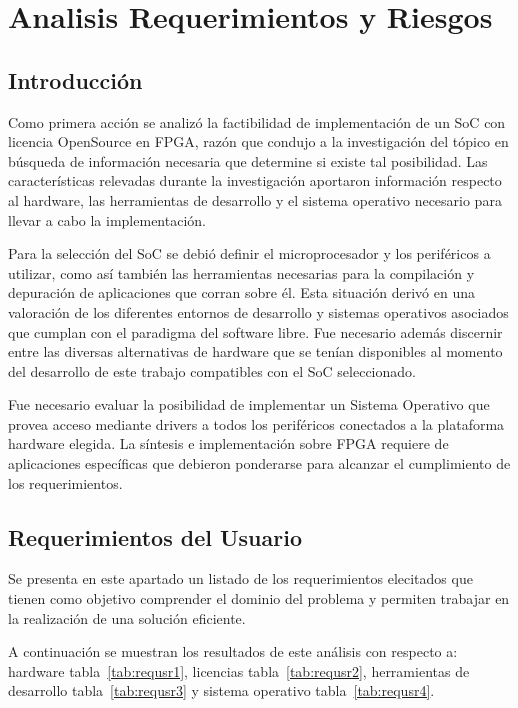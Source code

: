 \chapter{Analisis Requerimientos y Riesgos}\label {chap:reqyries}
	
	\section{Introducción}
	\par
	Como primera acción se analizó la factibilidad de implementación de un SoC con licencia OpenSource en FPGA, razón que condujo a la investigación del
	tópico en búsqueda de información necesaria que determine si existe tal posibilidad. Las características relevadas durante la investigación
	aportaron información respecto al hardware, las herramientas de desarrollo y el sistema operativo necesario para llevar a cabo la implementación. 
	\par
	Para la selección del SoC se debió definir el microprocesador y los periféricos a utilizar, como así también las herramientas necesarias para la
	compilación y depuración de aplicaciones que corran sobre él. Esta situación derivó en una valoración de los diferentes entornos de desarrollo y
	sistemas operativos asociados que cumplan con el paradigma del software libre. Fue necesario además discernir entre las diversas alternativas de
	hardware que se tenían disponibles al momento del desarrollo de este trabajo compatibles con el SoC seleccionado. 
	\par
	Fue necesario evaluar la posibilidad de implementar un Sistema Operativo que provea acceso mediante drivers a todos los periféricos conectados a
	la plataforma hardware elegida. La síntesis e implementación sobre FPGA requiere de aplicaciones específicas que debieron ponderarse para alcanzar el
	cumplimiento de los requerimientos.
	
	\newpage 
	
	\section{Requerimientos del Usuario}\label{sec:requsuario}
	\par
	Se presenta en este apartado un listado de los requerimientos elecitados que tienen como objetivo comprender el dominio del problema y permiten trabajar en la realización de una solución eficiente.

	A continuación se muestran los resultados de este análisis con respecto a: hardware tabla~\ref {tab:requsr1}, licencias tabla~\ref {tab:requsr2}, herramientas de desarrollo tabla~\ref {tab:requsr3} y sistema operativo tabla~\ref {tab:requsr4}.

